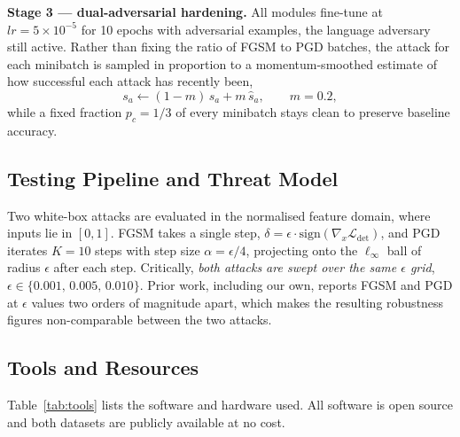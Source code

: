\documentclass[conference]{IEEEtran}
\newcommand{\Loss}{\mathcal{L}}
\renewcommand{\cite}[1]{\unskip}
\begin{document}
\textbf{Stage 3 --- dual-adversarial hardening.} All modules fine-tune at
$lr = 5 \times 10^{-5}$ for 10 epochs with adversarial examples, the language
adversary still active. Rather than fixing the ratio of FGSM to PGD batches,
the attack for each minibatch is sampled in proportion to a momentum-smoothed
estimate of how successful each attack has recently been,
\begin{equation}
s_a \leftarrow (1 - m)\, s_a + m\, \hat{s}_a, \qquad m = 0.2,
\end{equation}
while a fixed fraction $p_c = 1/3$ of every minibatch stays clean to preserve
baseline accuracy.

\subsection{Testing Pipeline and Threat Model}
\label{sec:threat}
Two white-box attacks are evaluated in the normalised feature domain, where
inputs lie in $[0,1]$. FGSM \cite{goodfellow2015fgsm} takes a single step,
$\delta = \epsilon \cdot \mathrm{sign}(\nabla_x \Loss_{\mathrm{det}})$, and
PGD \cite{madry2018pgd} iterates $K = 10$ steps with step size
$\alpha = \epsilon / 4$, projecting onto the $\ell_\infty$ ball of radius
$\epsilon$ after each step. Critically, \emph{both attacks are swept over the
same $\epsilon$ grid}, $\epsilon \in \{0.001,\, 0.005,\, 0.010\}$. Prior work,
including our own, reports FGSM and PGD at $\epsilon$ values two orders of
magnitude apart, which makes the resulting robustness figures non-comparable
between the two attacks.

\subsection{Tools and Resources}
Table~\ref{tab:tools} lists the software and hardware used. All software is
open source and both datasets are publicly available at no cost.
\end{document}
